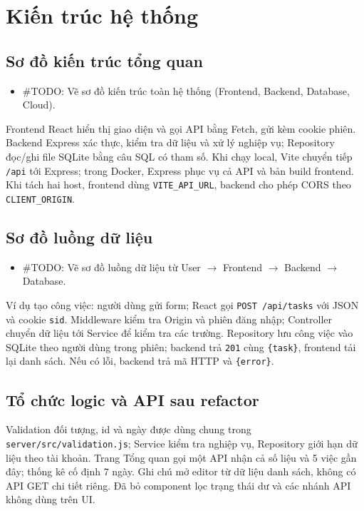 \section{Kiến trúc hệ thống}


\subsection{Sơ đồ kiến trúc tổng quan}
\begin{itemize}
  \item \#TODO: Vẽ sơ đồ kiến trúc toàn hệ thống (Frontend, Backend, Database, Cloud).
\end{itemize}
Frontend React hiển thị giao diện và gọi API bằng Fetch, gửi kèm cookie phiên. Backend Express xác thực, kiểm tra dữ liệu và xử lý nghiệp vụ; Repository đọc/ghi file SQLite bằng câu SQL có tham số. Khi chạy local, Vite chuyển tiếp \texttt{/api} tới Express; trong Docker, Express phục vụ cả API và bản build frontend. Khi tách hai host, frontend dùng \texttt{VITE\_API\_URL}, backend cho phép CORS theo \texttt{CLIENT\_ORIGIN}.

\subsection{Sơ đồ luồng dữ liệu}
\begin{itemize}
  \item \#TODO: Vẽ sơ đồ luồng dữ liệu từ User $\rightarrow$ Frontend $\rightarrow$ Backend $\rightarrow$ Database.
\end{itemize}
Ví dụ tạo công việc: người dùng gửi form; React gọi \texttt{POST /api/tasks} với JSON và cookie \texttt{sid}. Middleware kiểm tra Origin và phiên đăng nhập; Controller chuyển dữ liệu tới Service để kiểm tra các trường. Repository lưu công việc vào SQLite theo người dùng trong phiên; backend trả \texttt{201} cùng \texttt{\{task\}}, frontend tải lại danh sách. Nếu có lỗi, backend trả mã HTTP và \texttt{\{error\}}.

\subsection{Tổ chức logic và API sau refactor}
Validation đối tượng, id và ngày được dùng chung trong \texttt{server/src/validation.js};
Service kiểm tra nghiệp vụ, Repository giới hạn dữ liệu theo tài khoản.
Trang Tổng quan gọi một API nhận cả số liệu và 5 việc gần đây; thống kê cố định 7 ngày.
Ghi chú mở editor từ dữ liệu danh sách, không có API GET chi tiết riêng.
Đã bỏ component lọc trạng thái dư và các nhánh API không dùng trên UI.

